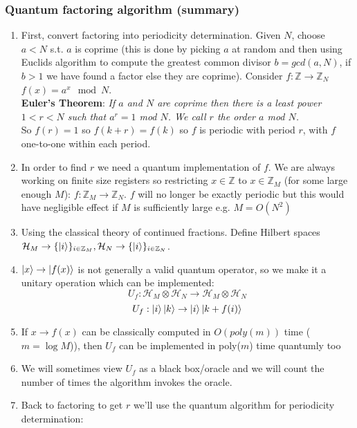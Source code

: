 \documentclass{article}
\begin{document}
\subsubsection{Quantum factoring algorithm (summary)}
\begin{enumerate}
        \item First, convert factoring into periodicity determination. Given $N$, choose $a< N$ s.t. $a$ is coprime (this is done by picking $a$ at random and then using Euclids algorithm to compute the greatest common divisor $b= gcd(a,N)$, if $b>1$ we have found a factor else they are coprime). Consider $f: \mathbb{Z} \rightarrow \mathbb{Z}_N$ $f(x) = a^x \mod N$.\\
                \textbf{Euler's Theorem}: \textsl{If $a$ and $N$ are coprime then there is a least power $1 < r < N$ such that $a^r = 1$ mod $N$. We call $r$ the order $a$ mod $N$.}\\ So $f(r) =1$ so $f(k+r) = f(k)$ so $f$ is periodic with period $r$, with $f$ one-to-one within each period.
        \item In order to find $r$ we need a quantum implementation of $f$. We are always working on finite size registers so restricting $x \in \mathbb{Z}$ to $x \in \mathbb{Z}_M$ (for some large enough $M$): $f: \mathbb{Z}_M \rightarrow \mathbb{Z}_N$. $f$ will no longer be exactly periodic but this would have negligible effect if $M$ is sufficiently large e.g. $M=O(N^2)$
        \item Using the classical theory of continued fractions. Define Hilbert spaces $\mathcal{H}_M \rightarrow \{\ket{i}\}_{i \in \mathbb{Z}_M}, \mathcal{H}_N\rightarrow \{\ket{i}\}_{i \in \mathbb{Z}_N}$.
        \item $\ket{x} \rightarrow \ket{f(x)}$ is not generally a valid quantum operator, so we make it a unitary operation which can be implemented:
                $$
                U_f: \mathcal{H}_M \otimes \mathcal{H}_N \rightarrow \mathcal{H}_M \otimes \mathcal{H}_N
                $$
                $$
                U_f: \ket{i} \ket{k} \rightarrow \ket{i} \ket{k + f(i)}
                $$
        \item If $x \rightarrow f(x)$ can be classically computed in $O(poly(m))$ time ($m = \log M$)), then $U_f$ can be implemented in poly($m$) time quantumly too
        \item We will sometimes view $U_f$ as a black box/oracle and we will count the number of times the algorithm invokes the oracle.
        \item Back to factoring to get $r$ we'll use the quantum algorithm for periodicity determination:

\end{enumerate}
\end{document}
